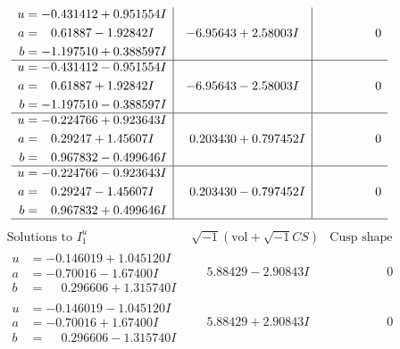 \documentclass[1p]{elsarticle_modified}
\theoremstyle{definition}
\newcommand{\I}{\sqrt{-1}}
\begin{document}
$$\begin{array}{c|c|c}
\begin{aligned}
u &= -0.431412 + 0.951554 I \\
a &= \phantom{-}0.61887 - 1.92842 I \\
b &= -1.197510 + 0.388597 I\end{aligned}
 & -6.95643 + 2.58003 I & \phantom{-0.000000 } 0 \\ \hline\begin{aligned}
u &= -0.431412 - 0.951554 I \\
a &= \phantom{-}0.61887 + 1.92842 I \\
b &= -1.197510 - 0.388597 I\end{aligned}
 & -6.95643 - 2.58003 I & \phantom{-0.000000 } 0 \\ \hline\begin{aligned}
u &= -0.224766 + 0.923643 I \\
a &= \phantom{-}0.29247 + 1.45607 I \\
b &= \phantom{-}0.967832 - 0.499646 I\end{aligned}
 & \phantom{-}0.203430 + 0.797452 I & \phantom{-0.000000 } 0 \\ \hline\begin{aligned}
u &= -0.224766 - 0.923643 I \\
a &= \phantom{-}0.29247 - 1.45607 I \\
b &= \phantom{-}0.967832 + 0.499646 I\end{aligned}
 & \phantom{-}0.203430 - 0.797452 I & \phantom{-0.000000 } 0\\
 \hline 
 \end{array}$$\newpage$$\begin{array}{c|c|c}  
\text{Solutions to }I^u_{1}& \I (\text{vol} + \sqrt{-1}CS) & \text{Cusp shape}\\
 \hline 
\begin{aligned}
u &= -0.146019 + 1.045120 I \\
a &= -0.70016 - 1.67400 I \\
b &= \phantom{-}0.296606 + 1.315740 I\end{aligned}
 & \phantom{-}5.88429 - 2.90843 I & \phantom{-0.000000 } 0 \\ \hline\begin{aligned}
u &= -0.146019 - 1.045120 I \\
a &= -0.70016 + 1.67400 I \\
b &= \phantom{-}0.296606 - 1.315740 I\end{aligned}
 & \phantom{-}5.88429 + 2.90843 I & \phantom{-0.000000 } 0 \\ \hline\begin{aligned}

\end{aligned}
\end{array}$$
\end{document}
